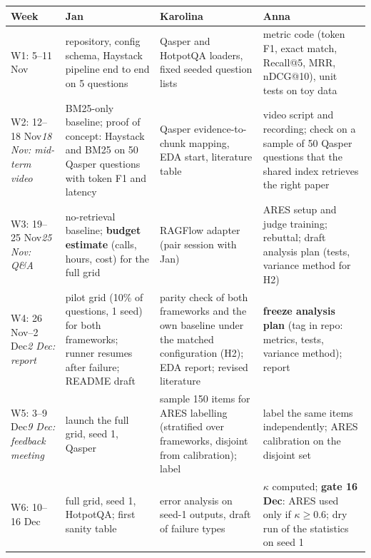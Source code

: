 \documentclass[11pt]{article}
\begin{document}
\begin{table}[t]
\centering\footnotesize
\setlength{\tabcolsep}{4pt}
\begin{tabular}{@{}>{\raggedright\arraybackslash}p{2.7cm}>{\raggedright\arraybackslash}p{4.1cm}>{\raggedright\arraybackslash}p{4.1cm}>{\raggedright\arraybackslash}p{4.1cm}@{}}
\toprule
\textbf{Week} & \textbf{Jan} & \textbf{Karolina} & \textbf{Anna}\\
\midrule
W1: 5--11 Nov & repository, config schema, Haystack pipeline end to end on 5 questions & Qasper and HotpotQA loaders, fixed seeded question lists & metric code (token F1, exact match, Recall@5, MRR, nDCG@10), unit tests on toy data\\
\addlinespace
W2: 12--18 Nov\newline\textit{18 Nov: mid-term video} & BM25-only baseline; proof of concept: Haystack and BM25 on 50 Qasper questions with token F1 and latency & Qasper evidence-to-chunk mapping, EDA start, literature table & video script and recording; check on a sample of 50 Qasper questions that the shared index retrieves the right paper\\
\addlinespace
W3: 19--25 Nov\newline\textit{25 Nov: Q\&A} & no-retrieval baseline; \textbf{budget estimate} (calls, hours, cost) for the full grid & RAGFlow adapter (pair session with Jan) & ARES setup and judge training; rebuttal; draft analysis plan (tests, variance method for H2)\\
\addlinespace
W4: 26 Nov--2 Dec\newline\textit{2 Dec: report} & pilot grid (10\% of questions, 1 seed) for both frameworks; runner resumes after failure; README draft & parity check of both frameworks and the own baseline under the matched configuration (H2); EDA report; revised literature & \textbf{freeze analysis plan} (tag in repo: metrics, tests, variance method); report\\
\addlinespace
W5: 3--9 Dec\newline\textit{9 Dec: feedback meeting} & launch the full grid, seed 1, Qasper & sample 150 items for ARES labelling (stratified over frameworks, disjoint from calibration); label & label the same items independently; ARES calibration on the disjoint set\\
\addlinespace
W6: 10--16 Dec & full grid, seed 1, HotpotQA; first sanity table & error analysis on seed-1 outputs, draft of failure types & $\kappa$ computed; \textbf{gate 16 Dec}: ARES used only if $\kappa\ge0.6$; dry run of the statistics on seed 1\\

\end{tabular}
\end{table}
\end{document}
